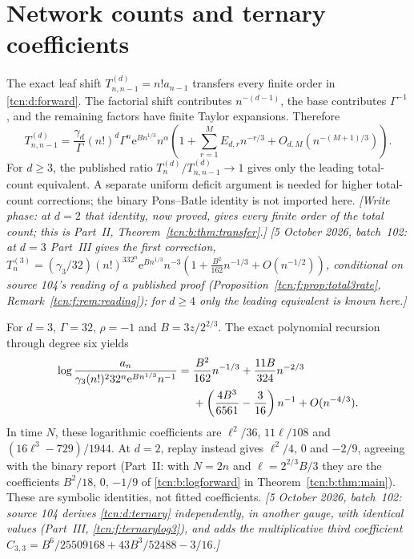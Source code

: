 \documentclass[11pt,letterpaper]{article}
\newcommand{\ee}{\mathrm e}
\theoremstyle{remark}
\begin{document}
\section{Network counts and ternary coefficients}\label{tcn:d:sec:networks}
The exact leaf shift $T_{n,n-1}^{(d)}=n!a_{n-1}$ transfers every finite order in \eqref{tcn:d:forward}. The factorial shift contributes $n^{-(d-1)}$, the base contributes $\Gamma^{-1}$, and the remaining factors have finite Taylor expansions. Therefore
\begin{equation}\label{tcn:d:netall}
 T_{n,n-1}^{(d)}=\frac{\gamma_d}{\Gamma}(n!)^d\Gamma^n\ee^{Bn^{1/3}}n^\alpha
 \left(1+\sum_{r=1}^M E_{d,r}n^{-r/3}+O_{d,M}(n^{-(M+1)/3})\right).
\end{equation}
For $d\ge3$, the published ratio $T_n^{(d)}/T_{n,n-1}^{(d)}\to1$ gives only the leading total-count equivalent. A separate uniform deficit argument is needed for higher total-count corrections; the binary Pons--Batle identity is not imported here. \emph{[Write phase: at $d=2$ that identity, now proved, gives every finite order of the total count; this is Part~II, Theorem~\ref{tcn:b:thm:transfer}.]}
\emph{[5 October 2026, batch~102: at $d=3$ Part~III gives the first correction, $T^{(3)}_n=(\gamma_3/32)(n!)^332^n\ee^{Bn^{1/3}}n^{-3}(1+\frac{B^2}{162}n^{-1/3}+O(n^{-1/2}))$, conditional on source 104's reading of a published proof (Proposition~\ref{tcn:f:prop:total3rate}, Remark~\ref{tcn:f:rem:reading}); for $d\ge4$ only the leading equivalent is known here.]}

For $d=3$, $\Gamma=32$, $\rho=-1$ and $B=3z/2^{2/3}$. The exact polynomial recursion through degree six yields
\begin{align}\label{tcn:d:ternary}
 \log\frac{a_n}{\gamma_3(n!)^2 32^n\ee^{Bn^{1/3}}n^{-1}}
 ={}&\frac{B^2}{162}n^{-1/3}+\frac{11B}{324}n^{-2/3}\notag\\
 &+\left(\frac{4B^3}{6561}-\frac3{16}\right)n^{-1}+O(n^{-4/3}).
\end{align}
In time $N$, these logarithmic coefficients are $\ell^2/36$, $11\ell/108$ and $(16\ell^3-729)/1944$. At $d=2$, replay instead gives $\ell^2/4$, $0$ and $-2/9$, agreeing with the binary report (Part~II: with $N=2n$ and $\ell=2^{2/3}B/3$ they are the coefficients $B^2/18$, $0$, $-1/9$ of \eqref{tcn:b:logforward} in Theorem~\ref{tcn:b:thm:main}). These are symbolic identities, not fitted coefficients.
\emph{[5 October 2026, batch~102: source 104 derives \eqref{tcn:d:ternary} independently, in another gauge, with identical values (Part~III, \eqref{tcn:f:ternarylog3}), and adds the multiplicative third coefficient $C_{3,3}=B^6/25509168+43B^3/52488-3/16$.]}
\end{document}
